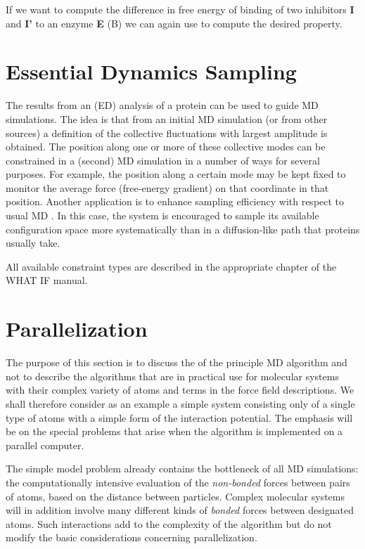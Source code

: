 If we want to compute the difference in free energy of binding of two
inhibitors {\bf I} and {\bf I'} to an enzyme {\bf E} (B)
we can again use  to compute the desired property.

\section{Essential Dynamics Sampling}
The results from an  (ED)
analysis \cite{Amadei93}
of a protein can be used to guide MD simulations. The idea is that
from an initial MD simulation (or from other sources) a definition of
the collective fluctuations with largest amplitude is obtained. The
position along one or more of these collective modes can be
constrained in a (second) MD simulation in a number of ways for
several purposes. For example, the position along a certain mode may
be kept fixed to monitor the average force (free-energy gradient) on
that coordinate in that position. Another application is to enhance
sampling efficiency with respect to usual MD
\cite{Degroot96a,Degroot96b}. In this case, the system is encouraged
to sample its available configuration space more systematically than
in a diffusion-like path that proteins usually take.

All available constraint types are described in the appropriate chapter
of the WHAT IF \cite{Whatif} manual.


\section{Parallelization}
\label{sec:par}

\newcommand{\abs}[1]{\mid \! {#1} \! \mid}

The purpose of this section is to discuss the 
 of the 
principle MD algorithm and not to describe the algorithms that are in 
practical use for molecular systems with their complex variety of atoms 
and terms in the force field descriptions. We shall therefore consider 
as an example a simple system consisting only of a single type of atoms 
with a simple form of the interaction potential. The emphasis will be 
on the special problems that arise when the algorithm is implemented on 
a parallel computer. 

The simple model problem already contains the bottleneck of all MD 
simulations: the computationally intensive evaluation of the 
{\em non-bonded} forces between pairs of atoms, based on the distance 
between particles. Complex molecular systems will in addition 
involve many different kinds of {\em bonded} forces between designated 
atoms. Such interactions add to the complexity of the algorithm but do 
not modify the basic considerations concerning parallelization.


